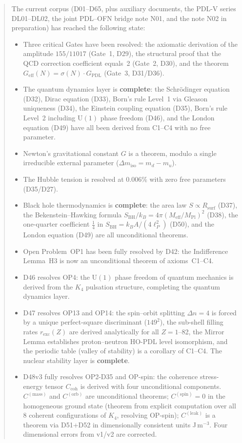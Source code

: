 \documentclass[11pt,a4paper]{article}
\theoremstyle{plain}
\theoremstyle{definition}
\theoremstyle{remark}
\newcommand{\Kfour}{K_4}
\newcommand{\Geff}{G_{\mathrm{eff}}}
\newcommand{\GPDL}{G_{\mathrm{PDL}}}
\newcommand{\Rsurf}{R_{\mathrm{surf}}}
\newcommand{\sigmaN}{\sigma(N)}
\newcommand{\SBH}{S_{\mathrm{BH}}}
\newcommand{\Meff}{M_{\mathrm{eff}}}
\newcommand{\MPl}{M_{\mathrm{Pl}}}
\newcommand{\Ccoh}{C_{\mathrm{coh}}}
\begin{document}
\begin{abstract}
The current corpus (D01--D65, plus auxiliary documents, the PDL-V series DL01--DL02, the joint PDL--OFN bridge note N01, and the note N02 in preparation) has reached the following state:
\begin{itemize}
\item Three critical Gates have been resolved: the axiomatic derivation of the amplitude $155/11017$ (Gate~1, D29), the structural proof that the QCD correction coefficient equals~2 (Gate~2, D30), and the theorem $\Geff(N)=\sigmaN\cdot\GPDL$ (Gate~3, D31/D36).
\item The quantum dynamics layer is \textbf{complete}: the Schr\"odinger equation (D32), Dirac equation (D33), Born's rule Level~1 via Gleason uniqueness (D34), the Einstein coupling equation (D35), Born's rule Level~2 including $\mathrm{U}(1)$ phase freedom (D46), and the London equation (D49) have all been derived from C1--C4 with no free parameter.
\item Newton's gravitational constant $G$ is a theorem, modulo a single irreducible external parameter ($\Delta m_{\mathrm{iso}} = m_d - m_u$).
\item The Hubble tension is resolved at $0.006\%$ with zero free parameters (D35/D27).
\item Black hole thermodynamics is \textbf{complete}: the area law $S \propto \Rsurf$ (D37), the Bekenstein--Hawking formula $\SBH/k_B = 4\pi(\Meff/\MPl)^2$ (D38), the one-quarter coefficient $\tfrac{1}{4}$ in $\SBH = k_B A/(4\ell_P^2)$ (D50), and the London equation (D49) are all unconditional theorems.
\item Open Problem~OP1 has been fully resolved by D42: the Indifference Lemma~H3 is now an unconditional theorem of axioms~C1--C4.
\item D46 resolves OP4: the $\mathrm{U}(1)$ phase freedom of quantum mechanics is derived from the $\Kfour$ pulsation structure, completing the quantum dynamics layer.
\item D47 resolves OP13 and OP14: the spin--orbit splitting $\Delta n = 4$ is forced by a unique perfect-square discriminant ($149^2$), the sub-shell filling rates $r_{\mathrm{exc}}(Z)$ are derived analytically for all $Z = 1$--82, the Mirror Lemma establishes proton--neutron HO-PDL level isomorphism, and the periodic table (valley of stability) is a corollary of C1--C4. The nuclear stability layer is \textbf{complete}.
\item D48v3 fully resolves OP2-D35 and OP-spin: the coherence stress-energy tensor $\Ccoh$ is derived with four unconditional components. $C^{(\mathrm{mass})}$ and $C^{(\mathrm{orb})}$ are unconditional theorems; $C^{(\mathrm{spin})}=0$ in the homogeneous ground state (theorem from explicit computation over all 8 coherent configurations of $K_4$, resolving OP-spin); $C^{(\mathrm{leak})}$ is a theorem via D51+D52 in dimensionally consistent units J\,m$^{-3}$. Four dimensional errors from v1/v2 are corrected.

\end{itemize}
\end{abstract}
\end{document}
